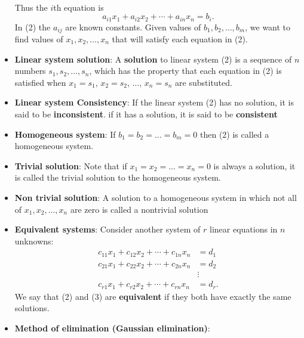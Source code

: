 \documentclass{report}
\begin{document}
\begin{itemize}
\[\begin{aligned}
                \end{aligned}
                \tag{2}
            \]
            \bigbreak \noindent 
            Thus the \(i\)th equation is
            \[
                a_{i1}x_1 + a_{i2}x_2 + \cdots + a_{in}x_n = b_i.
            \]
            \bigbreak \noindent 
            In (2) the \(a_{ij}\) are known constants. Given values of \(b_1, b_2, \ldots, b_m\), we want to find values of \(x_1, x_2, \ldots, x_n\) that will satisfy each equation in (2).
        \item \textbf{Linear system solution}:
            A \textbf{solution} to linear system (2) is a sequence of \(n\) numbers \(s_1, s_2, \ldots, s_n\), which has the property that each equation in (2) is satisfied when \(x_1 = s_1\), \(x_2 = s_2\), \(\ldots\), \(x_n = s_n\) are substituted.
        \item \textbf{Linear system Consistency}: If the linear system (2) has no solution, it is said to be \textbf{inconsistent}. if it has a solution, it is said to be \textbf{consistent}
        \item \textbf{Homogeneous system}: If $b_{1} = b_{2} = ... = b_{m} = 0 $ then (2) is called a homogeneous system.
        \item \textbf{Trivial solution}: Note that if $x_{1} = x_{2} = ... = x_{n} = 0$ is always a solution, it is called the trivial solution to the homogeneous system.
        \item \textbf{Non trivial solution}:  A solution to a homogeneous system in which not all of $x_{1}, x_{2}, ..., x_{n}$ are zero is called a nontrivial solution
        \item \textbf{Equivalent systems}:
            \noindent Consider another system of \(r\) linear equations in \(n\) unknowns:
            \[
                \begin{aligned}
                    c_{11}x_1 + c_{12}x_2 + \cdots + c_{1n}x_n &= d_1 \\
                    c_{21}x_1 + c_{22}x_2 + \cdots + c_{2n}x_n &= d_2 \\
                                                               &\vdots \\
                    c_{r1}x_1 + c_{r2}x_2 + \cdots + c_{rn}x_n &= d_r.
                \end{aligned}
                \tag{3}
            \]
            \noindent We say that (2) and (3) are \textbf{equivalent} if they both have exactly the same solutions.
        \item \textbf{Method of elimination (Gaussian elimination)}:

\end{itemize}
\end{document}
